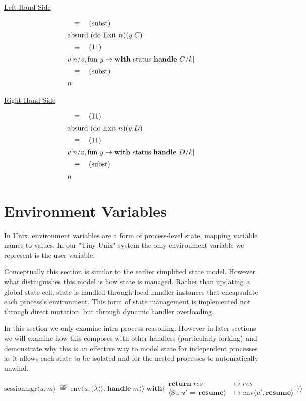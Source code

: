 \documentclass[logo,bsc,singlespacing,parskip]{infthesis}
\begin{document}
\underline{Left Hand Side}

\[
\begin{array}{l}
\quad\equiv\quad (\text{subst}) \\[5pt]
\text{absurd (do Exit } n) (y. C) \\[5pt]
\quad\equiv\quad (11) \\[5pt]
v [n/v, \text{fun } y \rightarrow \text{\textbf{with} status \textbf{handle} } C/k] \\[5pt]
\quad\equiv\quad (\text{subst}) \\[5pt]
n
\end{array}
\]

\underline{Right Hand Side}

\[
\begin{array}{l}
\quad\equiv\quad (11) \\[5pt]
\text{absurd (do Exit } n) (y. D) \\[5pt]
\quad\equiv\quad (11) \\[5pt]
v [n/v, \text{fun } y \rightarrow \text{\textbf{with} status \textbf{handle} } D/k] \\[5pt]
\quad\equiv\quad (\text{subst}) \\[5pt]
n
\end{array}
\]

\section{Environment Variables}
In Unix, environment variables are a form of process-level state, mapping variable names to values. In our "Tiny Unix" system the only environment variable we represent is the user variable. 

Conceptually this section is similar to the earlier simplified state model. However what distinguishes this model is how state is managed. Rather than updating a global state cell, state is handled through local handler instances that encapsulate each process’s environment. This form of state management is implemented not through direct mutation, but through dynamic handler overloading. 

In this section we only examine intra process reasoning. However in later sections we will examine how this composes with other handlers (particularly forking) and demonstrate why this is an effective way to model state for independent processes as it allows each state to be isolated and for the nested processes to automatically unwind.


\[
\text{sessionmgr} \langle \mathit{u}, m \rangle \;\overset{\mathrm{def}}{=} \;
\text{env} \langle \mathit{u}, (\lambda \langle \rangle.\; \textbf{handle}\; m \langle \rangle\; \textbf{with}  \{ 
\begin{array}{ll}
  \textbf{return}\; res & \mapsto res \\
  \!\langle \text{Su}\; \mathit{u'} \Rightarrow \textbf{resume} \!\rangle & \mapsto \text{env} \langle \mathit{u'}, \textbf{resume} \rangle
\end{array}
\} \rangle 
\]
\end{document}
